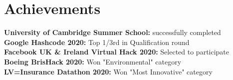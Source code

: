 \documentclass[a4paper,11pt]{article}
\begin{document}
\section{Achievements}
  \textbf{University of Cambridge Summer School:}{ successfully completed} \\
  \textbf{Google Hashcode 2020:} {Top 1/3rd in Qualification round} \\
  \textbf{Facebook UK \& Ireland Virtual Hack 2020:} {Selected to participate} \\
  \textbf{Boeing BrisHack 2020:} {Won "Environmental" category} \\
  \textbf{LV=Insurance Datathon 2020:} {Won "Most Innovative" category} \\

\bigskip
\end{document}

